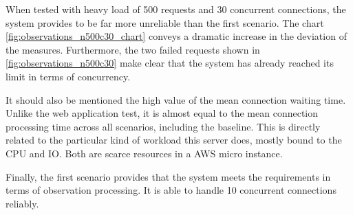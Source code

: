 When tested with heavy load of 500 requests and 30 concurrent connections, the system provides to be far more unreliable than the first scenario. The chart \ref{fig:observations_n500c30_chart} conveys a dramatic increase in the deviation of the measures. Furthermore, the two failed requests shown in \ref{fig:observations_n500c30} make clear that the system has already reached its limit in terms of concurrency.

It should also be mentioned the high value of the mean connection waiting time. Unlike the web application test, it is almost equal to the mean connection processing time across all scenarios, including the baseline. This is directly related to the particular kind of workload this server does,  mostly bound to the CPU and IO. Both are scarce resources in a AWS micro instance.

Finally, the first scenario provides that the system meets the requirements in terms of observation processing. It is able to handle 10 concurrent connections reliably.


